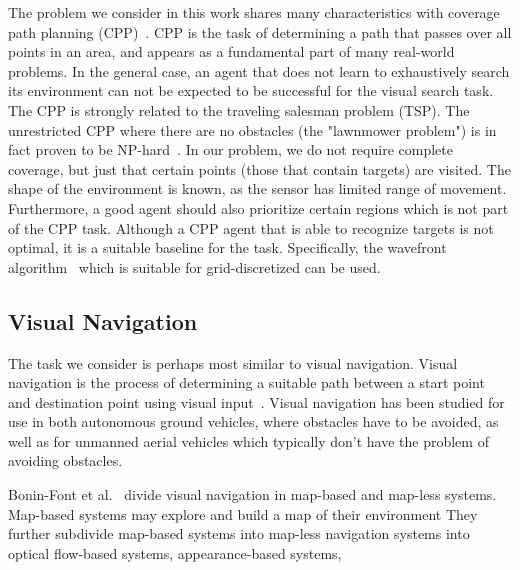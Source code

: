 The problem we consider in this work shares many characteristics with coverage path planning (CPP)~\cite{galceran_carreras_2013}.
CPP is the task of determining a path that passes over all points in an area, and appears as a fundamental part of many real-world problems. 
In the general case, an agent that does not learn to exhaustively search its environment can not be expected to be successful for the visual search task.
The CPP is strongly related to the traveling salesman problem (TSP).
The unrestricted CPP where there are no obstacles (the "lawnmower problem") is in fact proven to be NP-hard~\cite{arkin_lawnmowing_2000}.
In our problem, we do not require complete coverage, but just that certain points (those that contain targets) are visited.
The shape of the environment is known, as the sensor has limited range of movement.
Furthermore, a good agent should also prioritize certain regions which is not part of the CPP task.
Although a CPP agent that is able to recognize targets is not optimal, it is a suitable baseline for the task.
Specifically, the wavefront algorithm~\cite{galceran_carreras_2013} which is suitable for grid-discretized can be used. %


\subsection{Visual Navigation}



The task we consider is perhaps most similar to visual navigation.
Visual navigation is the process of determining a suitable path between a start point and destination point using visual input~\cite{bonin-font_visnav_2008}.
Visual navigation has been studied for use in both autonomous ground vehicles, where obstacles have to be avoided, as well as for unmanned aerial vehicles which typically don't have the problem of avoiding obstacles.

Bonin-Font et al.~\cite{bonin-font_visnav_2008} divide visual navigation in map-based and map-less systems.
Map-based systems may explore and build a map of their environment
They further subdivide map-based systems into map-less navigation systems into optical flow-based systems, appearance-based systems, 

